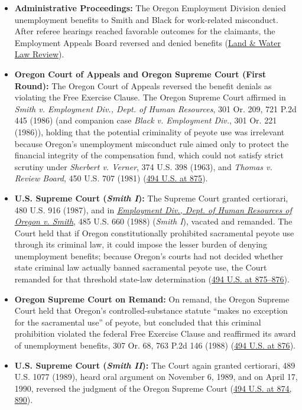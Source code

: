 \documentclass[12pt]{article}
\begin{document}
\begin{itemize}
  \item \textbf{Administrative Proceedings:} The Oregon Employment Division denied unemployment benefits to Smith and Black for work-related misconduct. After referee hearings reached favorable outcomes for the claimants, the Employment Appeals Board reversed and denied benefits (\href{https://scholarship.law.uwyo.edu/cgi/viewcontent.cgi?article=1898&context=land_water}{Land \& Water Law Review}).
  \item \textbf{Oregon Court of Appeals and Oregon Supreme Court (First Round):} The Oregon Court of Appeals reversed the benefit denials as violating the Free Exercise Clause. The Oregon Supreme Court affirmed in \textit{Smith v. Employment Div., Dept. of Human Resources}, 301 Or. 209, 721 P.2d 445 (1986) (and companion case \textit{Black v. Employment Div.}, 301 Or. 221 (1986)), holding that the potential criminality of peyote use was irrelevant because Oregon's unemployment misconduct rule aimed only to protect the financial integrity of the compensation fund, which could not satisfy strict scrutiny under \textit{Sherbert v. Verner}, 374 U.S. 398 (1963), and \textit{Thomas v. Review Board}, 450 U.S. 707 (1981) (\href{https://supreme.justia.com/cases/federal/us/494/872/}{494 U.S. at 875}).
  \item \textbf{U.S. Supreme Court (\textit{Smith I}):} The Supreme Court granted certiorari, 480 U.S. 916 (1987), and in \href{https://caselaw.findlaw.com/court/us-supreme-court/485/660.html}{\textit{Employment Div., Dept. of Human Resources of Oregon v. Smith}}, 485 U.S. 660 (1988) (\textit{Smith I}), vacated and remanded. The Court held that if Oregon constitutionally prohibited sacramental peyote use through its criminal law, it could impose the lesser burden of denying unemployment benefits; because Oregon's courts had not decided whether state criminal law actually banned sacramental peyote use, the Court remanded for that threshold state-law determination (\href{https://supreme.justia.com/cases/federal/us/494/872/}{494 U.S. at 875--876}).
  \item \textbf{Oregon Supreme Court on Remand:} On remand, the Oregon Supreme Court held that Oregon's controlled-substance statute ``makes no exception for the sacramental use'' of peyote, but concluded that this criminal prohibition violated the federal Free Exercise Clause and reaffirmed its award of unemployment benefits, 307 Or. 68, 763 P.2d 146 (1988) (\href{https://supreme.justia.com/cases/federal/us/494/872/}{494 U.S. at 876}).
  \item \textbf{U.S. Supreme Court (\textit{Smith II}):} The Court again granted certiorari, 489 U.S. 1077 (1989), heard oral argument on November 6, 1989, and on April 17, 1990, reversed the judgment of the Oregon Supreme Court (\href{https://www.courtlistener.com/opinion/112404/employment-div-dept-of-human-resources-of-ore-v-smith/}{494 U.S. at 874, 890}).
\end{itemize}
\end{document}
